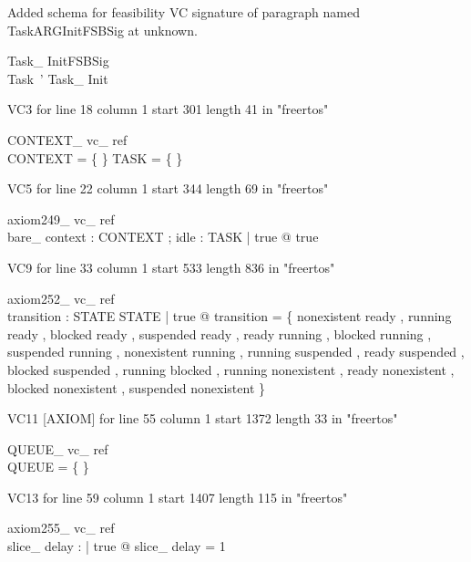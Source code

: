 \documentclass{article}
\begin{document}
Added schema for feasibility VC signature of paragraph named TaskARGInitFSBSig at unknown.
\begin{schema}{Task\_ InitFSBSig}
\\
 Task~' 
\where
 Task\_ Init
\end{schema}

VC3 for line 18 column 1 start 301 length 41 in "freertos"
\begin{theorem}{ CONTEXT\_ vc\_ ref}\\
 \lnot CONTEXT = \{ \} \land \lnot TASK = \{ \} \\

\end{theorem}

VC5 for line 22 column 1 start 344 length 69 in "freertos"
\begin{theorem}{ axiom249\_ vc\_ ref}\\
 \exists bare\_ context : CONTEXT ; idle : TASK | true @ true \\

\end{theorem}

VC9 for line 33 column 1 start 533 length 836 in "freertos"
\begin{theorem}{ axiom252\_ vc\_ ref}\\
 \exists transition : STATE \rel STATE | true @ transition = \{ nonexistent \mapsto ready , running \mapsto ready , blocked \mapsto ready , suspended \mapsto ready , ready \mapsto running , blocked \mapsto running , suspended \mapsto running , nonexistent \mapsto running , running \mapsto suspended , ready \mapsto suspended , blocked \mapsto suspended , running \mapsto blocked , running \mapsto nonexistent , ready \mapsto nonexistent , blocked \mapsto nonexistent , suspended \mapsto nonexistent \} \\

\end{theorem}

VC11 [AXIOM] for line 55 column 1 start 1372 length 33 in "freertos"
\begin{theorem}{ QUEUE\_ vc\_ ref}\\
 \lnot QUEUE = \{ \} \\

\end{theorem}

VC13 for line 59 column 1 start 1407 length 115 in "freertos"
\begin{theorem}{ axiom255\_ vc\_ ref}\\
 \exists slice\_ delay : \nat | true @ slice\_ delay = 1 \\

\end{theorem}
\end{document}
